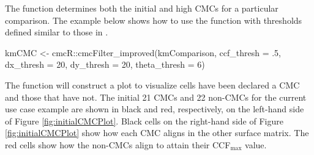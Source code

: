 The  function determines both the initial and
high CMCs for a particular comparison. The example below shows how to
use the function with thresholds defined similar to those in
\citet{song_estimating_2018}.

\begin{Schunk}
\begin{Sinput}
kmCMC <- cmcR::cmcFilter_improved(kmComparison,
                                  ccf_thresh = .5,
                                  dx_thresh = 20,
                                  dy_thresh = 20,
                                  theta_thresh = 6)
\end{Sinput}
\end{Schunk}

The  function will construct a plot to visualize cells
have been declared a CMC and those that have not. The initial 21 CMCs
and 22 non-CMCs for the current use case example are shown in black and
red, respectively, on the left-hand side of Figure
\ref{fig:initialCMCPlot}. Black cells on the right-hand side of Figure
\ref{fig:initialCMCPlot} show how each CMC aligns in the other surface
matrix. The red cells show how the non-CMCs align to attain their
CCF\(_{\max}\) value.

\begin{Schunk}
\end{Schunk}

